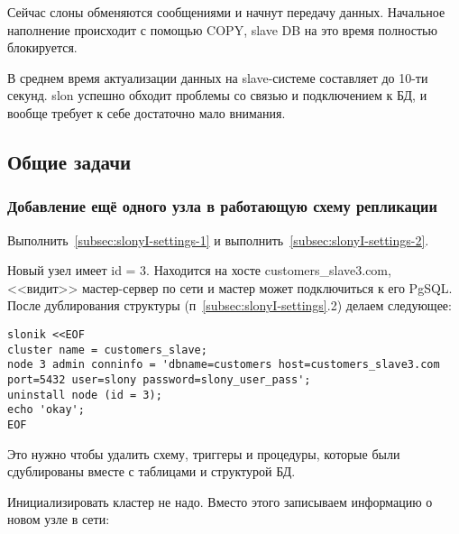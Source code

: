 Сейчас слоны обменяются сообщениями и начнут передачу данных. Начальное наполнение происходит с помощью COPY, slave DB на это время полностью блокируется.

В среднем время актуализации данных на slave-системе составляет до 10-ти секунд. slon успешно обходит проблемы со связью и подключением к БД, и вообще требует к себе достаточно мало внимания.

\subsection{Общие задачи}

\subsubsection{Добавление ещё одного узла в работающую схему репликации}

Выполнить~\ref{subsec:slonyI-settings-1} и выполнить~\ref{subsec:slonyI-settings-2}.

Новый узел имеет id = 3. Находится на хосте customers\_slave3.com, <<видит>> мастер-сервер по сети и мастер может подключиться к его PgSQL. После дублирования структуры (п~\ref{subsec:slonyI-settings}.2) делаем следующее:

\begin{lstlisting}[label=lst:slony13,caption=Общие задачи]
slonik <<EOF
cluster name = customers_slave;
node 3 admin conninfo = 'dbname=customers host=customers_slave3.com
port=5432 user=slony password=slony_user_pass';
uninstall node (id = 3);
echo 'okay';
EOF
\end{lstlisting}

Это нужно чтобы удалить схему, триггеры и процедуры, которые были сдублированы вместе с таблицами и структурой БД.

Инициализировать кластер не надо. Вместо этого записываем информацию о новом узле в сети:

